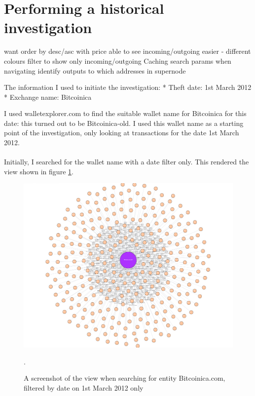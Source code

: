 \section{Performing a historical investigation}

want order by desc/asc with price
able to see incoming/outgoing easier - different colours
filter to show only incoming/outgoing 
Caching search params when navigating 
identify outputs to which addresses in supernode

The information I used to initiate the investigation:
* Theft date: 1st March 2012
* Exchange name: Bitcoinica 

I used walletexplorer.com to find the suitable wallet name for Bitcoinica for this date: this turned out to be Bitcoinica-old. I used this wallet name as a starting point of the investigation, only looking at transactions for the date 1st March 2012. 
\\\\
Initially, I searched for the wallet name with a date filter only. This rendered the view shown in figure \ref{fig:theft-no-filter}.

\begin{figure}[h!]
  \centering
  \includegraphics[width = 15cm]{./figures/theft-all-txs-1st-march}\\[0.5cm]
  \caption{A screenshot of the view when searching for entity Bitcoinica.com, filtered by date on 1st March 2012 only}.
  \label{fig:theft-no-filter}
\end{figure}

